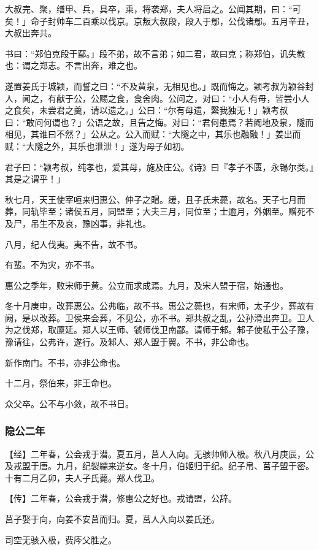 \documentclass[]{article}
\begin{document}
大叔完、聚，缮甲、兵，具卒，乘，将袭郑，夫人将启之。公闻其期，曰：``可矣！」命子封帅车二百乘以伐京。京叛大叔段，段入于鄢，公伐诸鄢。五月辛丑，大叔出奔共。

书曰：``郑伯克段于鄢。」段不弟，故不言弟；如二君，故曰克；称郑伯，讥失教也：谓之郑志。不言出奔，难之也。

遂置姜氏于城颖，而誓之曰：``不及黄泉，无相见也。」既而悔之。颖考叔为颖谷封人，闻之，有献于公，公赐之食，食舍肉。公问之，对曰：``小人有母，皆尝小人之食矣，未尝君之羹，请以遗之。」公曰：``尔有母遗，繄我独无！」颖考叔曰：``敢问何谓也？」公语之故，且告之悔。对曰：``君何患焉？若阙地及泉，隧而相见，其谁曰不然？」公从之。公入而赋：``大隧之中，其乐也融融！」姜出而赋：``大隧之外，其乐也泄泄！」遂为母子如初。

君子曰：``颖考叔，纯孝也，爱其母，施及庄公。《诗》曰『孝子不匮，永锡尔类。』其是之谓乎！」

秋七月，天王使宰咺来归惠公、仲子之賵。缓，且子氏未薨，故名。天子七月而葬，同轨毕至；诸侯五月，同盟至；大夫三月，同位至；士逾月，外姻至。赠死不及尸，吊生不及哀，豫凶事，非礼也。

八月，纪人伐夷。夷不告，故不书。

有蜚。不为灾，亦不书。

惠公之季年，败宋师于黄。公立而求成焉。九月，及宋人盟于宿，始通也。

冬十月庚申，改葬惠公。公弗临，故不书。惠公之薨也，有宋师，太子少，葬故有阙，是以改葬。卫侯来会葬，不见公，亦不书。郑共叔之乱，公孙滑出奔卫。卫人为之伐郑，取廪延。郑人以王师、虢师伐卫南鄙。请师于邾。邾子使私于公子豫，豫请往，公弗许，遂行。及邾人、郑人盟于翼。不书，非公命也。

新作南门。不书，亦非公命也。

十二月，祭伯来，非王命也。

众父卒。公不与小敛，故不书日。

\hypertarget{header-n29}{%
\subsubsection{隐公二年}\label{header-n29}}

【经】二年春，公会戎于潜。夏五月，莒人入向。无骇帅师入极。秋八月庚辰，公及戎盟于唐。九月，纪裂繻来逆女。冬十月，伯姬归于纪。纪子帛、莒子盟于密。十有二月乙卯，夫人子氏薨。郑人伐卫。

【传】二年春，公会戎于潜，修惠公之好也。戎请盟，公辞。

莒子娶于向，向姜不安莒而归。夏，莒人入向以姜氏还。

司空无骇入极，费庈父胜之。
\end{document}
